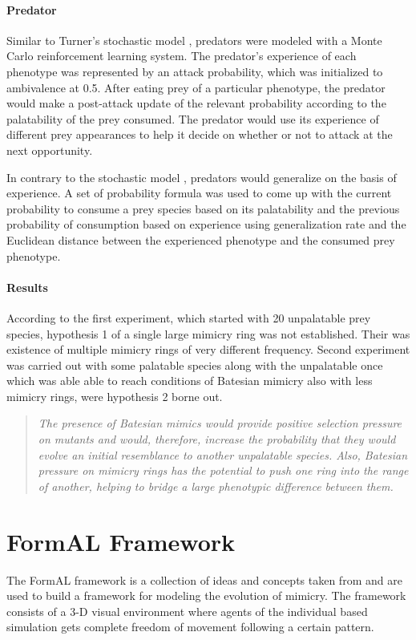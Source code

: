 \paragraph{Predator}
Similar to Turner's stochastic model \cite{turner_et_al1984},  predators were modeled with a Monte Carlo reinforcement learning system. The predator's experience of each phenotype was represented by an attack probability, which was initialized to ambivalence at 0.5. After eating prey of a particular phenotype, the predator would make a post-attack update of the relevant probability according to the palatability of the prey consumed. The predator would use its experience of different prey appearances to help it decide on whether or not to attack at the next opportunity.

In contrary to the stochastic model \cite{turner_et_al1984},  predators would generalize on the basis of experience. A set of probability formula was used to come up with the current probability to consume a prey species based on its palatability and the previous probability of consumption based on experience using generalization rate and the Euclidean distance between the experienced phenotype and the consumed prey phenotype. 

\paragraph{Results}
According to the first experiment, which started with 20 unpalatable prey species, hypothesis 1 of a single large mimicry ring was not established. Their was existence of multiple mimicry rings of very different frequency. Second experiment was carried out with some palatable species along with the unpalatable once which was able able to reach conditions of Batesian mimicry also with less mimicry rings, were hypothesis 2 borne out. 

\begin{quote}
\textsl{The presence of Batesian mimics would provide positive selection pressure on mutants and would, therefore, increase the probability that they would evolve an initial resemblance to another unpalatable species. Also, Batesian pressure on mimicry rings has the potential to push one ring into the range of another, helping to bridge a large phenotypic difference between them.}
\end{quote}

\section{FormAL Framework}
The FormAL framework is a collection of ideas and concepts taken from \cite{grogono2003} and are used to build a framework for modeling the evolution of mimicry. The framework consists of a 3-D visual environment where agents of the individual based simulation gets complete freedom of movement following a certain pattern.

